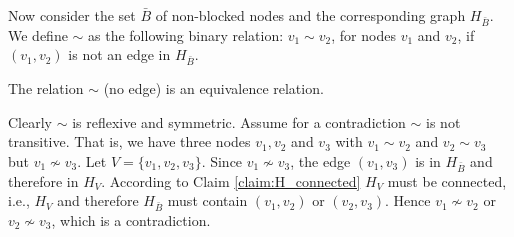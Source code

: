 \let\accentvec\vec \documentclass{llncs}
\newenvironment{proof_claim}{\upshape{\textsc{Proof of Claim.}}} {\hfill\ensuremath{\square}\smallskip}
\begin{document}
\noindent Now consider the set $\bar{B}$ of non-blocked nodes and the corresponding graph $H_{\bar{B}}$. 
We define $\sim$ as the following binary relation: $v_1\sim v_2$, for nodes $v_1$ and $v_2$, if
$(v_1,v_2)$ is not an edge in $H_{\bar{B}}$.
\begin{myClaim}
The relation $\sim$ (no edge) is an equivalence relation.
\end{myClaim}
\begin{proof_claim}
Clearly $\sim$ is reflexive and symmetric. Assume for a contradiction $\sim$ is not transitive.
That is, we have three nodes $v_1,v_2$ and $v_3$ with $v_1\sim v_2$ and $v_2\sim v_3$ but $v_1\not \sim v_3$.
Let $V=\{v_1,v_2,v_3\}$. Since $v_1\not \sim v_3$, the edge $(v_1,v_3)$ is in $H_{\bar{B}}$ and therefore in $H_V$.
According to Claim \ref{claim:H_connected} $H_V$ must be connected, i.e., $H_V$ and therefore $H_{\bar{B}}$ must contain $(v_1,v_2)$ or $(v_2,v_3)$.
Hence $v_1\not \sim v_2$ or $v_2\not\sim v_3$, which is a contradiction.
\end{proof_claim}
\end{document}
